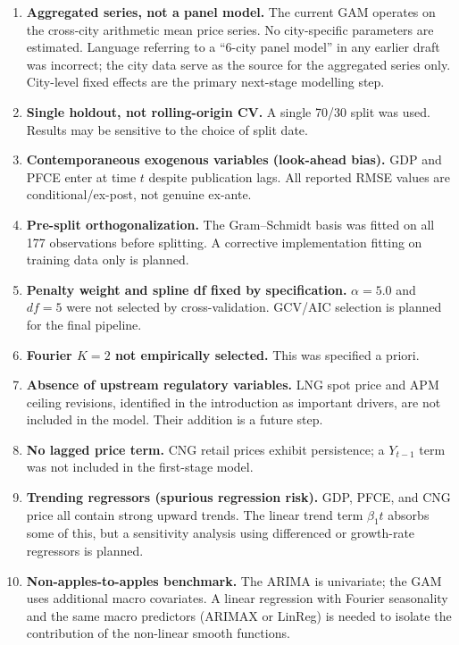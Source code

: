 \documentclass[11pt,a4paper]{article}
\begin{document}
\begin{enumerate}
  \item \textbf{Aggregated series, not a panel model.}  The current GAM
        operates on the cross-city arithmetic mean price series.  No
        city-specific parameters are estimated.  Language referring to a
        ``6-city panel model'' in any earlier draft was incorrect; the
        city data serve as the source for the aggregated series only.
        City-level fixed effects are the primary next-stage modelling step.

  \item \textbf{Single holdout, not rolling-origin CV.}  A single 70/30
        split was used.  Results may be sensitive to the choice of split date.

  \item \textbf{Contemporaneous exogenous variables (look-ahead bias).}
        GDP and PFCE enter at time $t$ despite publication lags.  All
        reported RMSE values are conditional/ex-post, not genuine ex-ante.

  \item \textbf{Pre-split orthogonalization.}  The Gram--Schmidt basis
        was fitted on all 177 observations before splitting.  A corrective
        implementation fitting on training data only is planned.

  \item \textbf{Penalty weight and spline df fixed by specification.}
        $\alpha = 5.0$ and $df = 5$ were not selected by cross-validation.
        GCV/AIC selection is planned for the final pipeline.

  \item \textbf{Fourier $K=2$ not empirically selected.}  This was
        specified a priori.

  \item \textbf{Absence of upstream regulatory variables.}  LNG spot price
        and APM ceiling revisions, identified in the introduction as important
        drivers, are not included in the model.  Their addition is a future step.

  \item \textbf{No lagged price term.}  CNG retail prices exhibit persistence;
        a $Y_{t-1}$ term was not included in the first-stage model.

  \item \textbf{Trending regressors (spurious regression risk).}  GDP, PFCE,
        and CNG price all contain strong upward trends.  The linear trend term
        $\beta_1 t$ absorbs some of this, but a sensitivity analysis using
        differenced or growth-rate regressors is planned.

  \item \textbf{Non-apples-to-apples benchmark.}  The ARIMA is univariate;
        the GAM uses additional macro covariates.  A linear regression with
        Fourier seasonality and the same macro predictors (ARIMAX or LinReg)
        is needed to isolate the contribution of the non-linear smooth functions.
\end{enumerate}
\end{document}
